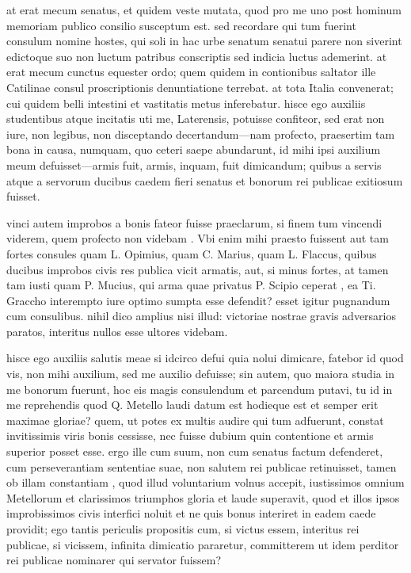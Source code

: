 at erat mecum senatus, et quidem veste mutata, quod pro me uno post hominum memoriam publico consilio susceptum est. sed recordare qui tum fuerint consulum nomine hostes, qui soli in hac urbe senatum senatui parere non siverint edictoque suo non luctum patribus conscriptis sed indicia luctus ademerint. at erat mecum cunctus equester ordo; quem quidem in contionibus saltator ille Catilinae consul proscriptionis denuntiatione terrebat. at tota Italia convenerat; cui quidem belli intestini et vastitatis metus inferebatur. hisce ego auxiliis studentibus atque incitatis uti me, Laterensis, potuisse confiteor, sed erat non iure, non legibus, non disceptando decertandum—nam profecto, praesertim tam bona in causa, numquam, quo ceteri saepe abundarunt, id mihi ipsi auxilium meum defuisset—armis fuit, armis, inquam, fuit dimicandum; quibus a servis atque a servorum ducibus caedem fieri senatus et bonorum rei publicae exitiosum fuisset.

 vinci autem improbos a bonis fateor fuisse praeclarum, si finem tum vincendi viderem, quem profecto non videbam . Vbi enim mihi praesto fuissent aut tam fortes consules quam L. Opimius, quam C. Marius, quam L. Flaccus, quibus ducibus improbos civis res publica vicit armatis, aut, si minus fortes, at tamen tam iusti quam P. Mucius, qui arma quae privatus P. Scipio ceperat , ea Ti. Graccho interempto iure optimo sumpta esse defendit? esset igitur pugnandum cum consulibus. nihil dico amplius nisi illud: victoriae nostrae gravis adversarios paratos, interitus nullos esse ultores videbam.

 hisce ego auxiliis salutis meae si idcirco defui quia nolui dimicare, fatebor id quod vis, non mihi auxilium, sed me auxilio defuisse; sin autem, quo maiora studia in me bonorum fuerunt, hoc eis magis consulendum et parcendum putavi, tu id in me reprehendis quod Q. Metello laudi datum est hodieque est et semper erit maximae gloriae? quem, ut potes ex multis audire qui tum adfuerunt, constat invitissimis viris bonis cessisse, nec fuisse dubium quin contentione et armis superior posset esse. ergo ille cum suum, non cum senatus factum defenderet, cum perseverantiam sententiae suae, non salutem rei publicae retinuisset, tamen ob illam constantiam , quod illud voluntarium volnus accepit, iustissimos omnium Metellorum et clarissimos triumphos gloria et laude superavit, quod et illos ipsos improbissimos civis interfici noluit et ne quis bonus interiret in eadem caede providit; ego tantis periculis propositis cum, si victus essem, interitus rei publicae, si vicissem, infinita dimicatio pararetur, committerem ut idem perditor rei publicae nominarer qui servator fuissem?

